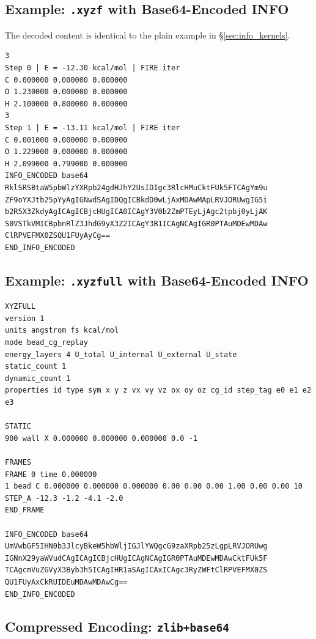 \documentclass[12pt, a4paper, oneside]{article}
\begin{document}
\subsection{Example: \texttt{.xyzf} with Base64-Encoded INFO}

The decoded content is identical to the plain example in \S\ref{sec:info_kernels}.

\begin{lstlisting}[language={},frame=single]
3
Step 0 | E = -12.30 kcal/mol | FIRE iter
C 0.000000 0.000000 0.000000
O 1.230000 0.000000 0.000000
H 2.100000 0.800000 0.000000
3
Step 1 | E = -13.11 kcal/mol | FIRE iter
C 0.001000 0.000000 0.000000
O 1.229000 0.000000 0.000000
H 2.099000 0.799000 0.000000
INFO_ENCODED base64
RklSRSBtaW5pbWlzYXRpb24gdHJhY2UsIDIgc3RlcHMuCktFUk5FTCAgYm9u
ZF9oYXJtb25pYyAgIGNwdSAgIDQgICBkdD0wLjAxMDAwMApLRVJORUwgIG5i
b2R5X3ZkdyAgICAgICBjcHUgICA0ICAgY3V0b2ZmPTEyLjAgc2tpbj0yLjAK
S0VSTkVMICBpbnRlZ3JhdG9yX3Z2ICAgY3B1ICAgNCAgIGR0PTAuMDEwMDAw
ClRPVEFMX0ZSQU1FUyAyCg==
END_INFO_ENCODED
\end{lstlisting}

\subsection{Example: \texttt{.xyzfull} with Base64-Encoded INFO}

\begin{lstlisting}[language={},frame=single]
XYZFULL
version 1
units angstrom fs kcal/mol
mode bead_cg_replay
energy_layers 4 U_total U_internal U_external U_state
static_count 1
dynamic_count 1
properties id type sym x y z vx vy vz ox oy oz cg_id step_tag e0 e1 e2 e3

STATIC
900 wall X 0.000000 0.000000 0.000000 0.0 -1

FRAMES
FRAME 0 time 0.000000
1 bead C 0.000000 0.000000 0.000000 0.00 0.00 0.00 1.00 0.00 0.00 10 STEP_A -12.3 -1.2 -4.1 -2.0
END_FRAME

INFO_ENCODED base64
UmVwbGF5IHN0b3JlcyBkeW5hbWljIGJlYWQgcG9zaXRpb25zLgpLRVJORUwg
IGNnX29yaWVudCAgICAgICBjcHUgICAgNCAgIGR0PTAuMDEwMDAwCktFUk5F
TCAgcmVuZGVyX3Byb3h5ICAgIHR1aSAgICAxICAgc3RyZWFtClRPVEFMX0ZS
QU1FUyAxCkRUIDEuMDAwMDAwCg==
END_INFO_ENCODED
\end{lstlisting}

\subsection{Compressed Encoding: \texttt{zlib+base64}}
\end{document}
